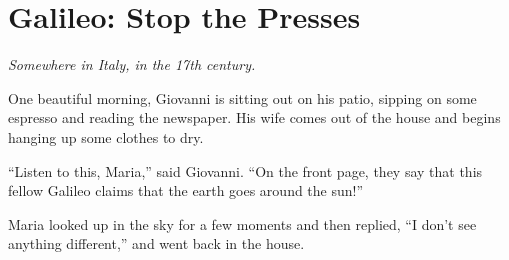\section{Galileo: Stop the Presses}

\emph{Somewhere in Italy, in the 17th century.}

One beautiful morning, Giovanni is sitting out on his patio, sipping on some espresso and reading the newspaper. His wife comes out of the house and begins hanging up some clothes to dry.

``Listen to this, Maria,'' said Giovanni. ``On the front page, they say that this fellow Galileo claims that the earth goes around the sun!''

Maria looked up in the sky for a few moments and then replied, ``I don't see anything different,'' and went back in the house.



